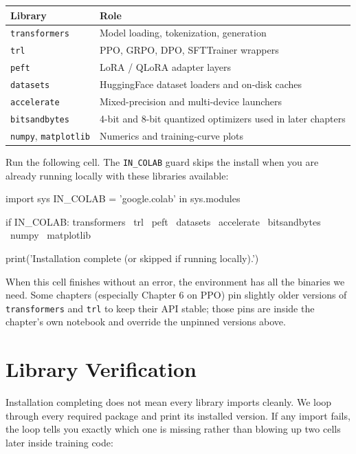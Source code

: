 \begin{chapterenv}
\begin{center}
\begin{tabular}{p{}p{}}
\toprule
\textbf{Library} & \textbf{Role} \\
\midrule
\texttt{transformers} & Model loading, tokenization, generation \\
\texttt{trl} & PPO, GRPO, DPO, SFTTrainer wrappers \\
\texttt{peft} & LoRA / QLoRA adapter layers \\
\texttt{datasets} & HuggingFace dataset loaders and on-disk caches \\
\texttt{accelerate} & Mixed-precision and multi-device launchers \\
\texttt{bitsandbytes} & 4-bit and 8-bit quantized optimizers used in later chapters \\
\texttt{numpy}, \texttt{matplotlib} & Numerics and training-curve plots \\
\bottomrule
\end{tabular}
\end{center}

Run the following cell. The \texttt{IN\_COLAB} guard skips the install when you are already running locally with these libraries available:

\begin{codeblock}[python]
import sys
IN_COLAB = 'google.colab' in sys.modules

if IN_COLAB:
        transformers \
        trl \
        peft \
        datasets \
        accelerate \
        bitsandbytes \
        numpy \
        matplotlib

print('Installation complete (or skipped if running locally).')
\end{codeblock}

When this cell finishes without an error, the environment has all the binaries we need. Some chapters (especially Chapter 6 on PPO) pin slightly older versions of \texttt{transformers} and \texttt{trl} to keep their API stable; those pins are inside the chapter's own notebook and override the unpinned versions above.

\section{Library Verification}

Installation completing does not mean every library imports cleanly. We loop through every required package and print its installed version. If any import fails, the loop tells you exactly which one is missing rather than blowing up two cells later inside training code:


\end{chapterenv}
